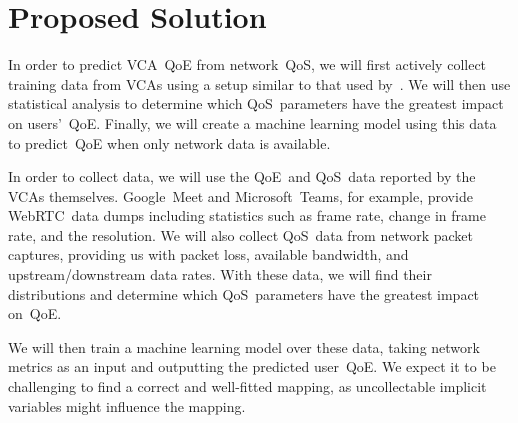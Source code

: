 \section{Proposed Solution}\label{proposed-solution}
    In order to predict VCA~QoE from network~QoS, we will first actively collect training data from VCAs using a setup similar to that used by~\textcite{MacMillanKyle2021MtPa}. We will then use statistical analysis to determine which QoS~parameters have the greatest impact on users'~QoE. Finally, we will create a machine learning model using this data to predict~QoE when only network data is available.

    In order to collect data, we will use the QoE~and QoS~data reported by the VCAs themselves. Google~Meet and Microsoft~Teams, for example, provide WebRTC~data dumps including statistics such as frame rate, change in frame rate, and the resolution. We will also collect QoS~data from network packet captures, providing us with packet loss, available bandwidth, and upstream/downstream data rates. With these data, we will find their distributions and determine which QoS~parameters have the greatest impact on~QoE.

    We will then train a machine learning model over these data, taking network metrics as an input and outputting the predicted user~QoE. We expect it to be challenging to find a correct and well-fitted mapping, as uncollectable implicit variables might influence the mapping.



